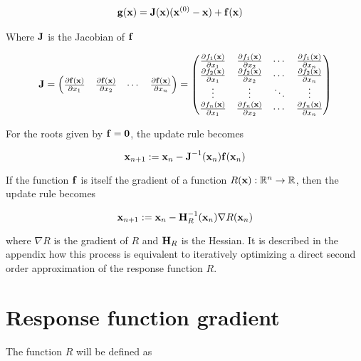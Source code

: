 \documentclass{article}
\newcommand{\R}{\mathbb{R}}
\newcommand{\vect}[1]{\textbf{\textrm{#1}}}
\newcommand{\pd}[2]{\frac{\partial {#1}}{\partial {#2}}}
\begin{document}
\begin{align} \label{tangent}
	\vect{g}(\vect{x}) & = \vect{J}(\vect{x})(\vect{x}^{(0)} - \vect{x}) + \vect{f}(\vect{x})
\end{align}

Where $\vect{J}$ is the Jacobian of $\vect{f}$

\begin{equation*}
	\vect{J} = 
	\begin{pmatrix}
		\pd{\vect{f}(\vect{x})}{x_1} & \pd{\vect{f}(\vect{x})}{x_2} & \cdots 
		& \pd{\vect{f}(\vect{x})}{x_n}
	\end{pmatrix} = 
	\begin{pmatrix}
		\pd{f_1(\vect{x})}{x_1} & \pd{f_1(\vect{x})}{x_2} & \cdots & \pd{f_1(\vect{x})}{x_n} \\
		\pd{f_2(\vect{x})}{x_1} & \pd{f_2(\vect{x})}{x_2} & \cdots & \pd{f_2(\vect{x})}{x_n} \\
		\vdots & \vdots & \ddots & \vdots \\
		\pd{f_n(\vect{x})}{x_1} & \pd{f_n(\vect{x})}{x_2} & \cdots & \pd{f_n(\vect{x})}{x_n}
	\end{pmatrix}
\end{equation*}

For the roots given by $\vect{f} = \vect{0}$, the update rule becomes

\begin{equation} \label{updaterule}
	\vect{x}_{n+1} := \vect{x}_n - \vect{J}^{-1}(\vect{x}_n)\vect{f}(\vect{x}_n)	
\end{equation}

If the function $\vect{f}$ is itself the gradient of a function $R(\vect{x}): \R^n \rightarrow \R$, then the update rule becomes

\begin{equation} \label{updateruledog}
	\vect{x}_{n+1} := \vect{x}_n - \vect{H}_R^{-1}(\vect{x}_n)\nabla R(\vect{x}_n)
\end{equation}

where $\nabla R$ is the gradient of $R$ and $\vect{H}_R$ is the Hessian.
It is described in the appendix how this process is equivalent to iteratively optimizing a direct second order approximation of the response function $R$.


\section{Response function gradient} \label{responsegradient}
The function $R$ will be defined as
\end{document}
